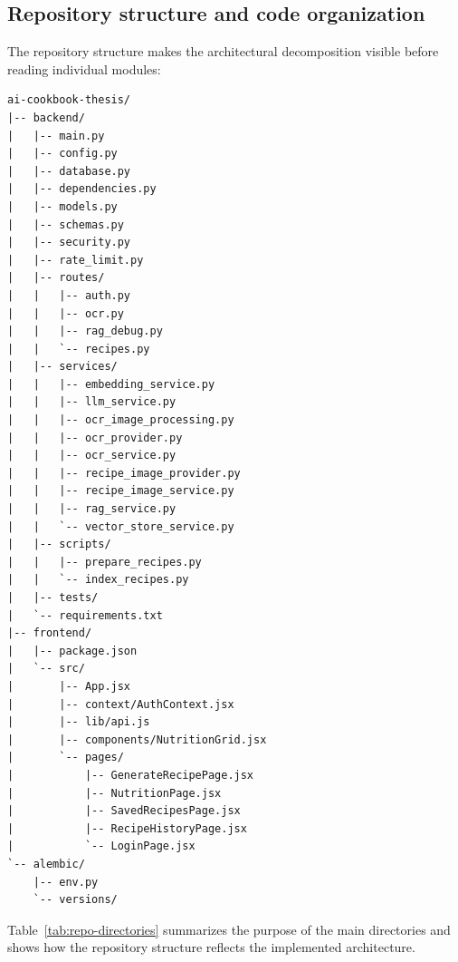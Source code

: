 \subsection{Repository structure and code organization}

The repository structure makes the architectural decomposition visible
before reading individual modules:

\begin{lstlisting}[caption={Repository structure of the implemented system},label={lst:repo-tree}]
ai-cookbook-thesis/
|-- backend/
|   |-- main.py
|   |-- config.py
|   |-- database.py
|   |-- dependencies.py
|   |-- models.py
|   |-- schemas.py
|   |-- security.py
|   |-- rate_limit.py
|   |-- routes/
|   |   |-- auth.py
|   |   |-- ocr.py
|   |   |-- rag_debug.py
|   |   `-- recipes.py
|   |-- services/
|   |   |-- embedding_service.py
|   |   |-- llm_service.py
|   |   |-- ocr_image_processing.py
|   |   |-- ocr_provider.py
|   |   |-- ocr_service.py
|   |   |-- recipe_image_provider.py
|   |   |-- recipe_image_service.py
|   |   |-- rag_service.py
|   |   `-- vector_store_service.py
|   |-- scripts/
|   |   |-- prepare_recipes.py
|   |   `-- index_recipes.py
|   |-- tests/
|   `-- requirements.txt
|-- frontend/
|   |-- package.json
|   `-- src/
|       |-- App.jsx
|       |-- context/AuthContext.jsx
|       |-- lib/api.js
|       |-- components/NutritionGrid.jsx
|       `-- pages/
|           |-- GenerateRecipePage.jsx
|           |-- NutritionPage.jsx
|           |-- SavedRecipesPage.jsx
|           |-- RecipeHistoryPage.jsx
|           `-- LoginPage.jsx
`-- alembic/
    |-- env.py
    `-- versions/
\end{lstlisting}

Table~\ref{tab:repo-directories} summarizes the purpose of the main
directories and shows how the repository structure reflects the
implemented architecture.

